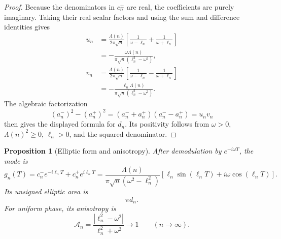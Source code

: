 \documentclass[11pt]{amsart}
\numberwithin{equation}{section}
\theoremstyle{plain}
\newtheorem{proposition}[theorem]{Proposition}
\theoremstyle{definition}
\theoremstyle{remark}
\newcommand{\1}{\mathbf{1}}
\begin{document}
\begin{proof}
Because the denominators in \(c_n^\pm\) are real, the coefficients are
purely imaginary.  Taking their real scalar factors and using the sum and
difference identities gives
\begin{align}
u_n
&=
\frac{\Lambda(n)}{2\pi\sqrt n}
\left[
\frac1{\omega-\ell_n}+\frac1{\omega+\ell_n}
\right]
\label{eq:un_proof_one}
\\
&=
-\frac{\omega\Lambda(n)}
{\pi\sqrt n(\ell_n^2-\omega^2)},
\label{eq:un_proof_two}
\\
v_n
&=
\frac{\Lambda(n)}{2\pi\sqrt n}
\left[
\frac1{\omega-\ell_n}-\frac1{\omega+\ell_n}
\right]
\label{eq:vn_proof_one}
\\
&=
-\frac{\ell_n\Lambda(n)}
{\pi\sqrt n(\ell_n^2-\omega^2)}.
\label{eq:vn_proof_two}
\end{align}
The algebraic factorization
\begin{equation}
(a_n^-)^2-(a_n^+)^2
=
(a_n^-+a_n^+)(a_n^--a_n^+)
=u_nv_n
\label{eq:dn_difference_squares}
\end{equation}
then gives the displayed formula for \(d_n\).  Its positivity follows
from \(\omega>0\), \(\Lambda(n)^2\geq0\), \(\ell_n>0\), and the squared
denominator.
\end{proof}

\begin{proposition}[Elliptic form and anisotropy]
\label{prop:ellipse_anisotropy}
After demodulation by \(e^{-i\omega T}\), the mode is
\begin{equation}
g_n(T)
=
c_n^-e^{-i\ell_nT}
+
c_n^+e^{i\ell_nT}
=
\frac{\Lambda(n)}
{\pi\sqrt n(\omega^2-\ell_n^2)}
\left[
\ell_n\sin(\ell_nT)
+
i\omega\cos(\ell_nT)
\right].
\label{eq:gn_ellipse}
\end{equation}
Its unsigned elliptic area is
\begin{equation}
\pi d_n.
\label{eq:ellipse_area}
\end{equation}
For uniform phase, its anisotropy is
\begin{equation}
\mathcal A_n
=
\frac{|\ell_n^2-\omega^2|}{\ell_n^2+\omega^2}
\longrightarrow1
\qquad(n\to\infty).
\label{eq:single_mode_anisotropy}
\end{equation}
\end{proposition}
\end{document}
